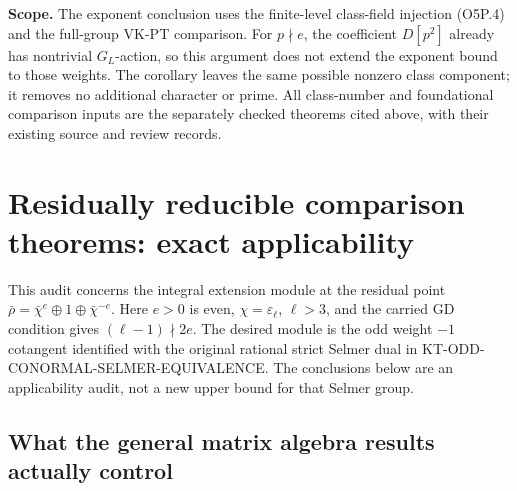 \documentclass[11pt,a4paper]{article}
\theoremstyle{definition}
\renewcommand{\paragraph}[1]{\par\smallskip\noindent\textbf{#1}\quad\ignorespaces}
\begin{document}
\paragraph{Scope.}
The exponent conclusion uses the finite-level class-field injection
(O5P.4) and the full-group VK-PT comparison.
For $p\nmid e$, the coefficient $D[p^2]$ already has nontrivial
$G_L$-action, so this argument does not extend the exponent bound
to those weights.  The corollary leaves the same possible nonzero
class component; it removes no additional character or prime.
All class-number and foundational comparison inputs are the
separately checked theorems cited above, with their existing
source and review records.



\section{Residually reducible comparison theorems: exact applicability}
\label{sec:kt-reducible-comparison}

This audit concerns the integral extension module at the residual
point $\bar\rho=\bar\chi^e\oplus1\oplus\bar\chi^{-e}$.
Here $e>0$ is even, $\chi=\varepsilon_\ell$, $\ell>3$, and the
carried GD condition gives $(\ell-1)\nmid2e$.  The desired module
is the odd weight $-1$ cotangent identified with the original
rational strict Selmer dual in KT-ODD-CONORMAL-SELMER-EQUIVALENCE.
The conclusions below are an applicability audit, not a new
upper bound for that Selmer group.

\subsection{What the general matrix algebra results actually control}
\end{document}
